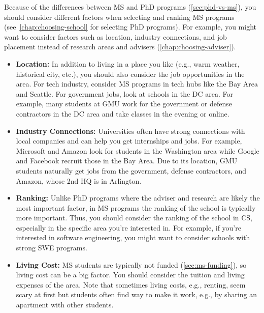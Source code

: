 \documentclass[oneside,11pt]{book}
\begin{document}
Because of the differences between MS and PhD programs (\autoref{sec:phd-vs-ms}), you should consider different factors when selecting and ranking MS programs (see~\autoref{chap:choosing-school} for selecting PhD programs). For example, you might want to consider factors such as location, industry connections, and job placement instead of research areas and advisers (\autoref{chap:choosing-adviser}).

\begin{itemize}

\item \textbf{Location:} In addition to living in a place you like (e.g., warm weather, historical city, etc.), you should also consider the job opportunities in the area.  For tech industry, consider MS programs in tech hubs like the Bay Area and Seattle. For government jobs, look at schools in the DC area.  For example, many students at GMU work for the government or defense contractors in the DC area and take classes in the evening or online.

\item \textbf{Industry Connections:} Universities often have strong connections with local companies and can help you get internships and jobs. For example, Microsoft and Amazon look for students in the Washington area while  Google and Facebook recruit those in the Bay Area.  Due to its location, GMU students naturally get jobs from the government, defense contractors, and Amazon, whose 2nd HQ is in Arlington.

\item \textbf{Ranking:} Unlike PhD programs where the adviser and research are likely the most important factor, in MS programs the ranking of the school is typically more important.  Thus, you should consider the ranking of the school in CS, especially in the specific area you're interested in.  For example, if you're interested in software engineering, you might want to consider schools with strong SWE programs. 

\item \textbf{Living Cost:} MS students are typically not funded (\autoref{sec:ms-funding}), so living cost can be a big factor. You should consider the tuition and living expenses of the area. Note that sometimes living costs, e.g., renting, seem scary at first but students often find way to make it work, e.g., by sharing an apartment with other students.

\end{itemize}
\end{document}
